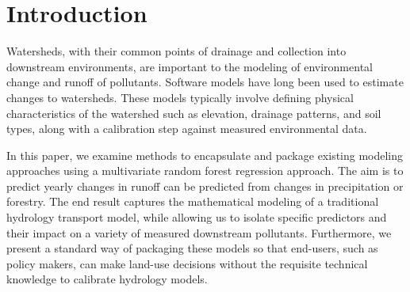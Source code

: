 \documentclass[runningheads]{llncs}
\begin{document}
\begin{abstract}
....

\end{abstract}
\section{Introduction}
Watersheds, with their common points of drainage and collection into downstream environments, are important to the modeling of environmental change and runoff of pollutants.
Software models have long been used to estimate changes to watersheds.
These models typically involve defining physical characteristics of the watershed such as elevation, drainage patterns, and soil types, along with a calibration step against measured environmental data.

In this paper, we examine methods to encapsulate and package existing modeling approaches using a multivariate random forest regression approach.
The aim is to predict yearly changes in runoff can be predicted from changes in precipitation or forestry.
The end result captures the mathematical modeling of a traditional hydrology transport model, while allowing us to isolate specific predictors and their impact on a variety of measured downstream pollutants.
Furthermore, we present a standard way of packaging these models so that end-users, such as policy makers, can make land-use decisions without the requisite technical knowledge to calibrate hydrology models.
\end{document}
